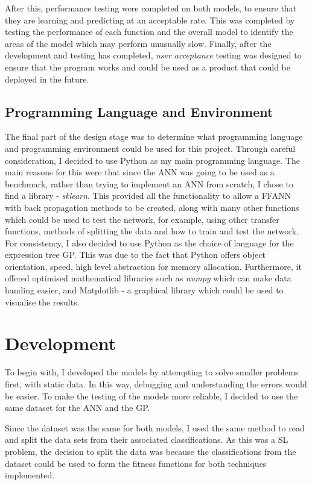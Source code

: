 \documentclass[11pt]{article}
\begin{document}
 After this, performance testing were completed on both models, to ensure that they are learning and predicting at an acceptable rate. This was completed by testing the performance of each function and the overall model to identify the areas of the model which may perform unusually slow. Finally, after the development and testing has completed, \textit{user acceptance} testing was designed to ensure that the program works and could be used as a product that could be deployed in the future. 
\subsection{Programming Language and Environment}\label{subsec:PLE}
The final part of the design stage was to determine what programming language and programming environment could be used for this project. Through careful consideration, I decided to use Python as my main programming language. The main reasons for this were that since the ANN was going to be used as a benchmark, rather than trying to implement an ANN from scratch, I chose to find a library - \textit{sklearn}. This provided all the functionality to allow a FFANN with back propagation methods to be created, along with many other functions which could be used to test the network, for example, using other transfer functions, methods of splitting the data and how to train and test the network. For consistency, I also decided to use Python as the choice of language for the expression tree GP. This was due to the fact that Python offers object orientation, speed, high level abstraction for memory allocation. Furthermore, it offered optimised mathematical libraries such as \textit{numpy} which can make data handing easier, and Matplotlib  - a graphical library which could be used to visualise the results. 
\section{Development}\label{subsubsec:DEV}
To begin with, I developed the models by attempting to solve smaller problems first, with static data. In this way, debugging and understanding the errors would be easier. To make the testing of the models more reliable, I decided to use the same dataset for the ANN and the GP. 

Since the dataset was the same for both models, I used the same method to read and split the data sets from their associated classifications. As this was a SL problem, the decision to split the data was because the classifications from the dataset could be used to form the fitness functions for both techniques implemented.
\end{document}

